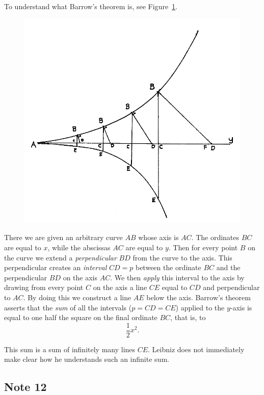 \documentclass[twoside,openright]{article}
\begin{document}
To understand what Barrow's theorem is, see Figure~\ref{barrowfig}.
\begin{figure}[ht]
\begin{center}
\includegraphics[width=\textwidth]{fig/Figure41}
\caption{}
\label{barrowfig}
\vspace{-10pt}
\end{center}
\end{figure} 
There we are given an arbitrary curve $AB$ whose axis is $AC$.  The
ordinates $BC$ are equal to $x$, while the abscissas $AC$ are equal to
$y$.  Then for every point $B$ on the curve we extend a {\em
  perpendicular} $BD$ from the curve to the axis.  This perpendicular
creates an {\em interval} $CD = p$ between the ordinate $BC$ and the
perpendicular $BD$ on the axis $AC$.  We then {\em apply} this
interval to the axis by drawing from every point $C$ on the axis a
line $CE$ equal to $CD$ and perpendicular to $AC$. By doing this we
construct a line $AE$ below the axis.  Barrow's theorem asserts that
the {\em sum} of all the intervals ($p= CD = CE$) applied to the
$y$-axis is equal to one half the square on the final ordinate $BC$,
that is, to
  $$ \frac{1}{2}x^2.$$ 
  
  This sum is a sum of infinitely many lines $CE$.  Leibniz does not
  immediately make clear how he understands such an infinite sum.

\subsection*{Note 12}
\label{crg12}
\end{document}
